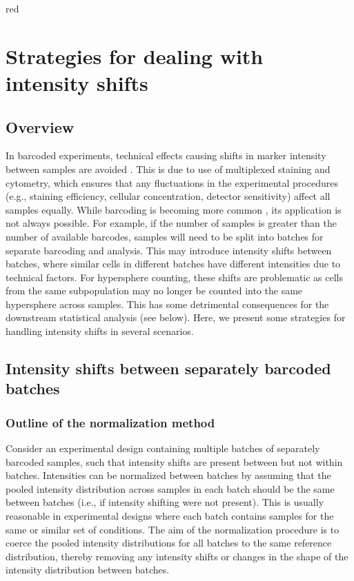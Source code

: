 \documentclass{article}
\begin{document}
\begin{color}{red}
\section{Strategies for dealing with intensity shifts}

\subsection{Overview}
In barcoded experiments, technical effects causing shifts in marker intensity between samples are avoided \cite{zunder2015palladium}.
This is due to use of multiplexed staining and cytometry, which ensures that any fluctuations in the experimental procedures (e.g., staining efficiency, cellular concentration, detector sensitivity) affect all samples equally.
While barcoding is becoming more common \cite{gaudilliere2014delayed,gaudilliere2015implementing}, its application is not always possible.
For example, if the number of samples is greater than the number of available barcodes, samples will need to be split into batches for separate barcoding and analysis.
This may introduce intensity shifts between batches, where similar cells in different batches have different intensities due to technical factors.
For hypersphere counting, these shifts are problematic as cells from the same subpopulation may no longer be counted into the same hypersphere across samples.
This has some detrimental consequences for the downstream statistical analysis (see below).
Here, we present some strategies for handling intensity shifts in several scenarios.

\subsection{Intensity shifts between separately barcoded batches}

\subsubsection{Outline of the normalization method}
Consider an experimental design containing multiple batches of separately barcoded samples, such that intensity shifts are present between but not within batches.
Intensities can be normalized between batches by assuming that the pooled intensity distribution across samples in each batch should be the same between batches (i.e., if intensity shifting were not present).
This is usually reasonable in experimental designs where each batch contains samples for the same or similar set of conditions.
The aim of the normalization procedure is to coerce the pooled intensity distributions for all batches to the same reference distribution, thereby removing any intensity shifts or changes in the shape of the intensity distribution between batches.


\end{color}
\end{document}
